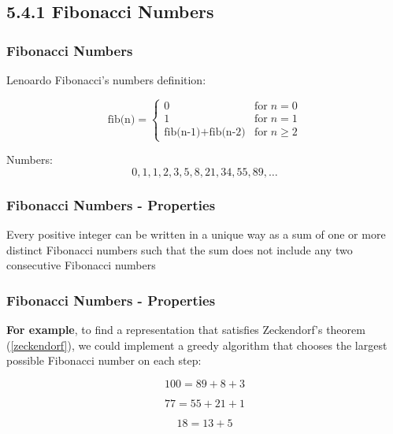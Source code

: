 \documentclass{beamer}
\begin{document}
\subsection{5.4.1 Fibonacci Numbers}

\begin{frame}[fragile]
\frametitle{Fibonacci Numbers}

Lenoardo Fibonacci's numbers definition:

\begin{equation*}
	\text{fib(n)} =
	\begin{cases}
		0 & \text{for} \; n=0 \\
		1 & \text{for} \; n=1 \\
		\text{fib(n-1)} + \text{fib(n-2)} & \text{for} \; n \geq 2				
	\end{cases}
\end{equation*}

Numbers: \\

\color{blue}$$0,1,1,2,3,5,8,21,34,55,89,\ldots$$\color{black}

\end{frame}

\begin{frame}[fragile]
\frametitle{Fibonacci Numbers - Properties}


\begin{theorem} \label{zeckendorf}

Every positive integer can be written in a unique way as a sum of one or more distinct Fibonacci numbers such that the sum does not include any two consecutive Fibonacci numbers

\end{theorem}

\end{frame}

\begin{frame}[fragile]
\frametitle{Fibonacci Numbers - Properties}

\textbf{For example}, to find a representation that satisfies Zeckendorf's theorem (\ref{zeckendorf}), we could implement a greedy algorithm that chooses the largest possible Fibonacci number on each step:

$$100 = 89 + 8 + 3$$

$$77 = 55 + 21 + 1$$

$$18 =13 + 5$$

\end{frame}
\end{document}
